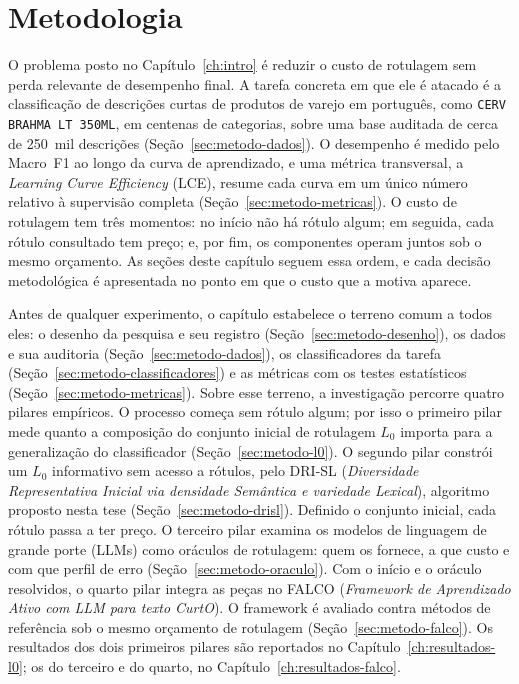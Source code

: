 \chapter{Metodologia}
\label{ch:metodo}

O problema posto no Capítulo~\ref{ch:intro} é reduzir o custo de rotulagem
sem perda relevante de desempenho final. A tarefa concreta em que ele é
atacado é a classificação de descrições curtas de produtos de varejo em
português, como \texttt{CERV BRAHMA LT 350ML}, em centenas de categorias,
sobre uma base auditada de cerca de 250~mil descrições
(Seção~\ref{sec:metodo-dados}). O desempenho é medido pelo Macro~F1 ao
longo da curva de aprendizado, e uma métrica transversal, a \textit{Learning
Curve Efficiency} (LCE), resume cada curva em um único número relativo à
supervisão completa (Seção~\ref{sec:metodo-metricas}). O custo de rotulagem
tem três momentos: no início não há rótulo algum; em seguida, cada rótulo
consultado tem preço; e, por fim, os componentes operam juntos sob o mesmo
orçamento. As seções deste capítulo seguem
essa ordem, e cada decisão metodológica é apresentada no ponto em que o
custo que a motiva aparece.

Antes de qualquer experimento, o capítulo estabelece o terreno comum a
todos eles: o desenho da pesquisa e seu registro
(Seção~\ref{sec:metodo-desenho}), os dados e sua auditoria
(Seção~\ref{sec:metodo-dados}), os classificadores da tarefa
(Seção~\ref{sec:metodo-classificadores}) e as métricas com os testes
estatísticos (Seção~\ref{sec:metodo-metricas}). Sobre esse terreno, a
investigação percorre quatro pilares empíricos. O processo começa sem
rótulo algum; por isso o primeiro pilar mede quanto a composição do
conjunto inicial de rotulagem $L_0$ importa para a generalização do
classificador (Seção~\ref{sec:metodo-l0}). O segundo pilar constrói um
$L_0$ informativo sem acesso a rótulos, pelo DRI-SL (\textit{Diversidade
Representativa Inicial via densidade Semântica e variedade Lexical}),
algoritmo proposto nesta tese (Seção~\ref{sec:metodo-drisl}). Definido o
conjunto inicial, cada rótulo passa a ter preço. O terceiro pilar examina
os modelos de linguagem de grande porte (LLMs) como oráculos de rotulagem:
quem os fornece, a que custo e com que perfil de erro
(Seção~\ref{sec:metodo-oraculo}). Com o início e o oráculo resolvidos, o
quarto pilar integra as peças no FALCO (\textit{Framework de Aprendizado
Ativo com LLM para texto CurtO}). O framework é avaliado contra métodos de referência sob o mesmo
orçamento de rotulagem (Seção~\ref{sec:metodo-falco}). Os resultados dos dois primeiros
pilares são reportados no Capítulo~\ref{ch:resultados-l0}; os do terceiro e
do quarto, no Capítulo~\ref{ch:resultados-falco}.

